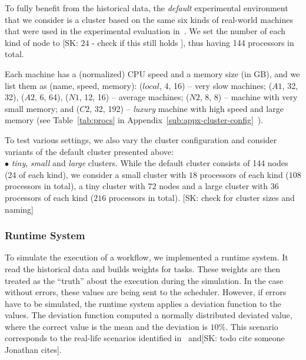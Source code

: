 \documentclass[conference]{IEEEtran}
\newcommand{\skug}[1]{{\color{blue}[SK: #1]}}
\begin{document}
    To fully benefit from the historical data, the  {\em default} experimental environment
    that we consider is a cluster based on the same six
    kinds of real-world machines that were used in the experimental evaluation in~\cite{lotaru}.
    We set the number of each kind of node to \skug{$24$ - check if this still holds }, thus having 144 processors in total. %

    Each machine has a (normalized) CPU speed and a memory size (in GB), and we list them as (name, speed, memory):
    ($local$, 4, 16) -- very slow machines; ($A1$, 32, 32), ($A2$, 6, 64), ($N1$, 12, 16) -- average machines; ($N2$, 8, 8) -- machine with very small memory; and ($C2$, 32, 192) -- {\em luxury} machine with high speed and large memory
    (see Table~\ref{tab:procs} in Appendix~\ref{sub:appx-cluster-config}~\cite{daghetpart_full_version}).

    To test various settings, we also vary the cluster configuration and consider
    variants of the default cluster presented above:\\
    $\bullet$ {\em tiny}, {\em small} and {\em large} clusters. While the default cluster consists of 144 nodes (24 of each kind), we
    consider a small cluster with $18$ processors of each kind ($108$ processors in total), a tiny cluster with $72$ nodes and a
    large cluster with $36$ processors of each kind ($216$ processors in total). \skug{check for cluster sizes and naming}\\

    \subsubsection{Runtime System}

    To simulate the execution of a workflow, we implemented a runtime system.
    It read the historical data and builds weights for tasks.
    These weights are then treated as the ``truth'' about the execution during the simulation.
    In the case without errors, these values are being sent to the scheduler.
    However, if errors have to be simulated, the runtime system applies a deviation function to the values.
    The deviation function computed a normally distributed deviated value, where the correct value is the mean and the deviation
    is $10\%$.
    This scenario corresponds to the real-life scenarios identified in~\cite{lotaru} and\skug{todo cite someone Jonathan cites}.
\end{document}
